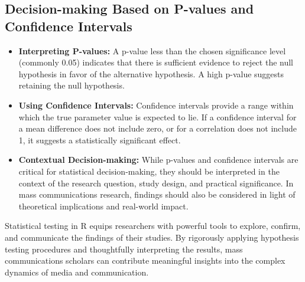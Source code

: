 \documentclass[
]{book}
\newenvironment{Shaded}{\begin{snugshade}}{\end{snugshade}}
\newcommand{\AttributeTok}[1]{\textcolor[rgb]{0.13,0.29,0.53}{#1}}
\newcommand{\CommentTok}[1]{\textcolor[rgb]{0.56,0.35,0.01}{\textit{#1}}}
\newcommand{\FunctionTok}[1]{\textcolor[rgb]{0.13,0.29,0.53}{\textbf{#1}}}
\newcommand{\NormalTok}[1]{#1}
\newcommand{\OtherTok}[1]{\textcolor[rgb]{0.56,0.35,0.01}{#1}}
\newcommand{\SpecialCharTok}[1]{\textcolor[rgb]{0.81,0.36,0.00}{\textbf{#1}}}
\newcommand{\StringTok}[1]{\textcolor[rgb]{0.31,0.60,0.02}{#1}}
\begin{document}
\begin{Shaded}
\end{Shaded}

\hypertarget{decision-making-based-on-p-values-and-confidence-intervals}{%
\subsection*{Decision-making Based on P-values and Confidence Intervals}\label{decision-making-based-on-p-values-and-confidence-intervals}}

\begin{itemize}
\item
  \textbf{Interpreting P-values:} A p-value less than the chosen significance level (commonly 0.05) indicates that there is sufficient evidence to reject the null hypothesis in favor of the alternative hypothesis. A high p-value suggests retaining the null hypothesis.
\item
  \textbf{Using Confidence Intervals:} Confidence intervals provide a range within which the true parameter value is expected to lie. If a confidence interval for a mean difference does not include zero, or for a correlation does not include 1, it suggests a statistically significant effect.
\item
  \textbf{Contextual Decision-making:} While p-values and confidence intervals are critical for statistical decision-making, they should be interpreted in the context of the research question, study design, and practical significance. In mass communications research, findings should also be considered in light of theoretical implications and real-world impact.
\end{itemize}

Statistical testing in R equips researchers with powerful tools to explore, confirm, and communicate the findings of their studies. By rigorously applying hypothesis testing procedures and thoughtfully interpreting the results, mass communications scholars can contribute meaningful insights into the complex dynamics of media and communication.
\end{document}

